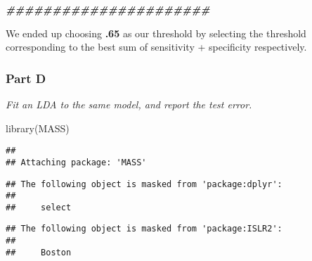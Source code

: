 \documentclass[
]{article}
\newenvironment{Shaded}{\begin{snugshade}}{\end{snugshade}}
\newcommand{\DocumentationTok}[1]{\textcolor[rgb]{0.56,0.35,0.01}{\textbf{\textit{#1}}}}
\newcommand{\FunctionTok}[1]{\textcolor[rgb]{0.00,0.00,0.00}{#1}}
\newcommand{\NormalTok}[1]{#1}
\begin{document}
\begin{Shaded}
\begin{Highlighting}[]
\DocumentationTok{\#\#\#\#\#\#\#\#\#\#\#\#\#\#\#\#\#\#\#\#\#\#}
\end{Highlighting}
\end{Shaded}

We ended up choosing \textbf{.65} as our threshold by selecting the
threshold corresponding to the best sum of sensitivity + specificity
respectively.

\hypertarget{part-d-2}{%
\subsubsection{Part D}\label{part-d-2}}

\emph{Fit an LDA to the same model, and report the test error.}

\begin{Shaded}
\begin{Highlighting}[]
\FunctionTok{library}\NormalTok{(MASS)}
\end{Highlighting}
\end{Shaded}

\begin{verbatim}
## 
## Attaching package: 'MASS'
\end{verbatim}

\begin{verbatim}
## The following object is masked from 'package:dplyr':
## 
##     select
\end{verbatim}

\begin{verbatim}
## The following object is masked from 'package:ISLR2':
## 
##     Boston
\end{verbatim}
\end{document}
